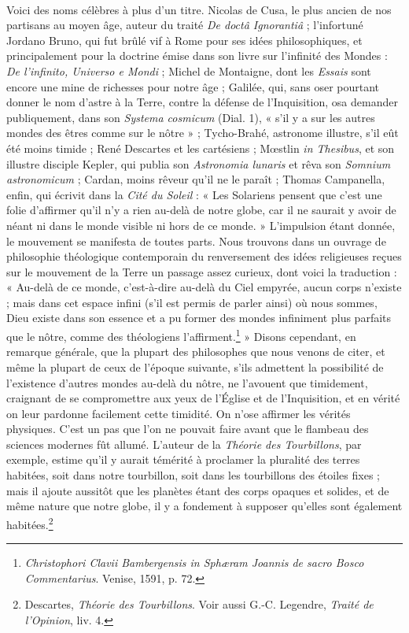 \documentclass[a4paper, 11pt, oneside, landscape]{article}
\begin{document}
\paragraph{}
Voici des noms célèbres à plus d'un titre. Nicolas de Cusa, le plus ancien de nos partisans au moyen âge, auteur du traité \emph{De doctâ Ignorantiâ} ; l'infortuné Jordano Bruno, qui fut brûlé vif à Rome pour ses idées philosophiques, et principalement pour la doctrine émise dans son livre sur l'infinité des Mondes : \emph{De l'infinito, Universo e Mondi} ; Michel de Montaigne, dont les \emph{Essais} sont encore une mine de richesses pour notre âge ; Galilée, qui, sans oser pourtant donner le nom d'astre à la Terre, contre la défense de l'Inquisition, osa demander publiquement, dans son \emph{Systema cosmicum} (Dial. 1), « s'il y a sur les autres mondes des êtres comme sur le nôtre » ; Tycho-Brahé, astronome illustre, s'il eût été moins timide ; René Descartes et les cartésiens ; Mœstlin \emph{in Thesibus}, et son illustre disciple Kepler, qui publia son \emph{Astronomia lunaris} et rêva son \emph{Somnium astronomicum} ; Cardan, moins rêveur qu'il ne le paraît ; Thomas Campanella, enfin, qui écrivit dans la \emph{Cité du Soleil} : « Les Solariens pensent que c'est une folie d'affirmer qu'il n'y a rien au-delà de notre globe, car il ne saurait y avoir de néant ni dans le monde visible ni hors de ce monde. » L'impulsion étant donnée, le mouvement se manifesta de toutes parts. Nous trouvons dans un ouvrage de philosophie théologique contemporain du renversement des idées religieuses reçues sur le mouvement de la Terre un passage assez curieux, dont voici la traduction : « Au-delà de ce monde, c'est-à-dire au-delà du Ciel empyrée, aucun corps n'existe ; mais dans cet espace infini (s'il est permis de parler ainsi) où nous sommes, Dieu existe dans son essence et a pu former des mondes infiniment plus parfaits que le nôtre, comme des théologiens l'affirment.\footnote{\emph{Christophori Clavii Bambergensis in Sphæram Joannis de sacro Bosco Commentarius}. Venise, 1591, p. 72.} » Disons cependant, en remarque générale, que la plupart des philosophes que nous venons de citer, et même la plupart de ceux de l'époque suivante, s'ils admettent la possibilité de l'existence d'autres mondes au-delà du nôtre, ne l'avouent que timidement, craignant de se compromettre aux yeux de l'Église et de l'Inquisition, et en vérité on leur pardonne facilement cette timidité. On n'ose affirmer les vérités physiques. C'est un pas que l'on ne pouvait faire avant que le flambeau des sciences modernes fût allumé. L'auteur de la \emph{Théorie des Tourbillons}, par exemple, estime qu'il y aurait témérité à proclamer la pluralité des terres habitées, soit dans notre tourbillon, soit dans les tourbillons des étoiles fixes ; mais il ajoute aussitôt que les planètes étant des corps opaques et solides, et de même nature que notre globe, il y a fondement à supposer qu'elles sont également habitées.\footnote{Descartes, \emph{Théorie des Tourbillons}. Voir aussi G.-C. Legendre, \emph{Traité de l'Opinion}, liv. 4.}
\end{document}

